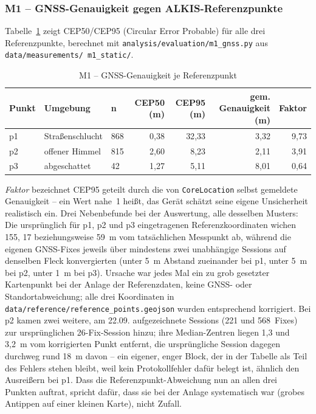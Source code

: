 \documentclass[11pt,a4paper,oneside]{article}
\begin{document}
\subsubsection{M1 -- GNSS-Genauigkeit gegen ALKIS-Referenzpunkte}
\label{sec:m1}

Tabelle~\ref{tab:m1} zeigt CEP50/CEP95 (Circular Error Probable) für alle
drei Referenzpunkte, berechnet mit
\texttt{analysis/evaluation/m1\_gnss.py} aus \texttt{data/measurements/
m1\_static/}.

\begin{table}[htbp]
\centering
\small
\caption{M1 -- GNSS-Genauigkeit je Referenzpunkt}
\label{tab:m1}
\begin{tabularx}{\linewidth}{@{}lllrrrr@{}}
\toprule
\textbf{Punkt} & \textbf{Umgebung} & \textbf{n} & \textbf{CEP50 (m)} &
\textbf{CEP95 (m)} & \textbf{gem. Genauigkeit (m)} & \textbf{Faktor} \\
\midrule
p1 & Straßenschlucht & 868 & 0{,}38 & 32{,}33 & 3{,}32 & 9{,}73 \\
p2 & offener Himmel & 815 & 2{,}60 & 8{,}23 & 2{,}11 & 3{,}91 \\
p3 & abgeschattet & 42 & 1{,}27 & 5{,}11 & 8{,}01 & 0{,}64 \\
\bottomrule
\end{tabularx}
\end{table}

\emph{Faktor} bezeichnet CEP95 geteilt durch die von \texttt{CoreLocation}
selbst gemeldete Genauigkeit -- ein Wert nahe~1 heißt, das Gerät schätzt
seine eigene Unsicherheit realistisch ein. Drei Nebenbefunde bei der
Auswertung, alle desselben Musters: Die ursprünglich für p1, p2 und p3
eingetragenen Referenzkoordinaten wichen 155, 17 beziehungsweise 59~m vom
tatsächlichen Messpunkt ab, während die eigenen GNSS-Fixes jeweils über
mindestens zwei unabhängige Sessions auf denselben Fleck konvergierten
(unter 5~m Abstand zueinander bei p1, unter 5~m bei p2, unter 1~m bei
p3). Ursache war jedes Mal ein zu grob gesetzter Kartenpunkt bei der
Anlage der Referenzdaten, keine GNSS- oder Standortabweichung; alle drei
Koordinaten in \texttt{data/reference/reference\_points.geojson} wurden
entsprechend korrigiert. Bei p2 kamen zwei weitere, am 22.09. aufgezeichnete
Sessions (221 und 568~Fixes) zur ursprünglichen 26-Fix-Session hinzu; ihre
Median-Zentren liegen 1{,}3 und 3{,}2~m vom korrigierten Punkt entfernt, die
ursprüngliche Session dagegen durchweg rund 18~m davon -- ein eigener,
enger Block, der in der Tabelle als Teil des Fehlers stehen bleibt, weil
kein Protokollfehler dafür belegt ist, ähnlich den Ausreißern bei p1.
Dass die Referenzpunkt-Abweichung nun an allen drei Punkten auftrat, spricht
dafür, dass sie bei der Anlage systematisch war (grobes Antippen auf einer
kleinen Karte), nicht Zufall.
\end{document}
